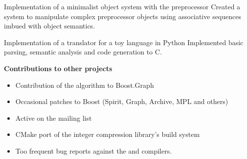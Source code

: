 \documentclass[10pt]{moderncv}
\newcommand{\myhref}[3][blue]{\href{#2}{\color{#1}{#3}}}
\begin{document}
{Implementation of a minimalist object system with the preprocessor}{
    Created a system to manipulate complex preprocessor objects using
    associative sequences imbued with object semantics.}

{Implementation of a translator for a toy language in Python}{
    Implemented basic parsing, semantic analysis and code generation to C.}

\cvline{}
{\textbf{Contributions to other projects}
\begin{itemize}
    \item Contribution of the \myhref{http://www.boost.org/doc/libs/release/libs/graph/doc/hawick_circuits.html}{hawick\_circuits} algorithm to Boost.Graph
    \item Occasional patches to Boost (Spirit, Graph, Archive, MPL and others)
    \item Active on the \myhref{http://news.gmane.org/gmane.comp.lib.boost.devel}{Boost.Dev} mailing list
    \item CMake port of the \myhref{http://github.com/lemire/FastPFor}{FastPFor}
          integer compression library's build system
    \item Too frequent bug reports against the \myhref{https://goo.gl/y9pYWP}{Clang}
          and \myhref{https://goo.gl/IhKUrK}{GCC} compilers.
\end{itemize}}
\end{document}
